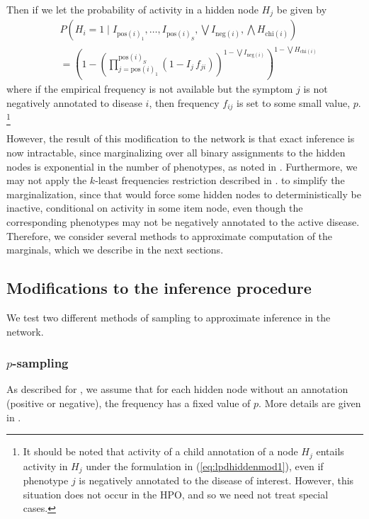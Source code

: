 Then if we let the probability of activity in a hidden node $H_j$ be given by
\begin{align}\label{eq:lpdhiddenmod1}
    &P\left(H_i = 1 \mid I_{\text{pos}(i)_1}, \hdots, I_{\text{pos}(i)_S},
    \bigvee I_{\text{neg}(i)}, \bigwedge H_{\text{chi}(i)}\right)\nonumber\\
        &= \left(
            1 - 
            \left(
                \prod_{j=\text{pos}(i)_1}^{\text{pos}(i)_S}
                \left(1 - I_j \, f_{ji}\right)
            \right) ^{1 - \bigvee I_{\text{neg}(i)}}
        \right)
        ^{1 - \bigvee H_{\text{chi}(i)}}
\end{align}
where if the empirical frequency is not available but the symptom $j$ is not
negatively annotated to disease $i$, then frequency $f_{ij}$ is set to some
small value, $p$.
%
\footnote{It should be noted that activity of a child annotation of a node
    $H_j$ entails activity in $H_j$ under the formulation in
    (\ref{eq:lpdhiddenmod1}), even if phenotype $j$ is negatively annotated
    to the disease of interest. However, this situation does not occur in the
    HPO, and so we need not treat special cases.
}

However, the result of this modification to the network is that exact inference
is now intractable, since marginalizing over all binary assignments to the
hidden nodes is exponential in the number of phenotypes,
as noted in . 
%
Furthermore, we may not apply the $k$-least frequencies restriction 
described in . 
to simplify the marginalization, since that would force some hidden nodes to
deterministically be inactive, conditional on activity in
some item node, even though the corresponding phenotypes may not be negatively
annotated to the active disease.
%
Therefore, we consider several methods to approximate computation of the
marginals, which we describe in the next sections.

\subsection{Modifications to the inference procedure}
\label{subsec:modinf}

We test two different methods of sampling to approximate inference in the
network.

\subsubsection{$p$-sampling}
\label{subsubsec:psampmodel}
%
As described for ,
we assume that for each hidden node without an annotation (positive or negative), the frequency
has a fixed value of $p$. 
%
More details are given in .

